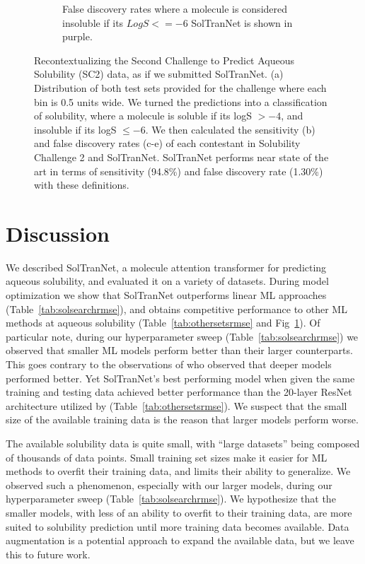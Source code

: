 \documentclass[journal=jmcmar,manuscript=article]{achemso}
\begin{document}
\begin{figure}[tb]
\begin{subfigure}[t]{0.32\textwidth}
        \caption{False discovery rates where a molecule is considered insoluble if its $LogS <=-6$ SolTranNet is shown in purple.}
    \end{subfigure}
    \caption{Recontextualizing the Second Challenge to Predict Aqueous Solubility (SC2) data, as if we submitted SolTranNet. (a) Distribution of both test sets provided for the challenge where each bin is 0.5 units wide. We turned the predictions into a classification of solubility, where a molecule is soluble if its logS $> -4$, and insoluble if its logS $\leq -6$. We then calculated the sensitivity (b) and false discovery rates (c-e) of each contestant in Solubility Challenge 2 and SolTranNet. SolTranNet performs near state of the art in terms of sensitivity (94.8\%) and false discovery rate (1.30\%) with these definitions.}
    \label{fig:sc2redo}
\end{figure}

\section{Discussion}

We described SolTranNet, a molecule attention transformer for predicting aqueous solubility, and evaluated it on a variety of datasets.
During model optimization we show that SolTranNet outperforms linear ML approaches (Table~\ref{tab:solsearchrmse}), and obtains competitive performance to other ML methods at aqueous solubility (Table~\ref{tab:othersetsrmse} and Fig~\ref{fig:sc2redo}).
Of particular note, during our hyperparameter sweep (Table~\ref{tab:solsearchrmse}) we observed that smaller ML models perform better than their larger counterparts.
This goes contrary to the observations of \citet{cui} who observed that deeper models performed better.
Yet SolTranNet's best performing model when given the same training and testing data achieved better performance than the 20-layer ResNet architecture utilized by \citet{cui} (Table~\ref{tab:othersetsrmse}).
We suspect that the small size of the available training data is the reason that larger models perform worse.

The available solubility data is quite small, with ``large datasets'' being composed of thousands of data points.
Small training set sizes make it easier for ML methods to overfit their training data, and limits their ability to generalize.
We observed such a phenomenon, especially with our larger models, during our hyperparameter sweep (Table~\ref{tab:solsearchrmse}).
We hypothesize that the smaller models, with less of an ability to overfit to their training data, are more suited to solubility prediction until more training data becomes available.
Data augmentation is a potential approach to expand the available data, but we leave this to future work.
\end{document}
